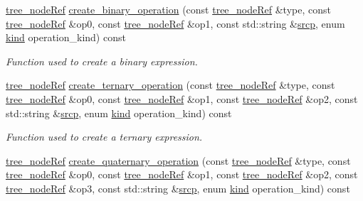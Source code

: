 \begin{DoxyCompactItemize}
\hyperlink{tree__node_8hpp_a6ee377554d1c4871ad66a337eaa67fd5}{tree\+\_\+node\+Ref} \hyperlink{classtree__manipulation_a69dbd230e26dc9f0677f16c57defe666}{create\+\_\+binary\+\_\+operation} (const \hyperlink{tree__node_8hpp_a6ee377554d1c4871ad66a337eaa67fd5}{tree\+\_\+node\+Ref} \&type, const \hyperlink{tree__node_8hpp_a6ee377554d1c4871ad66a337eaa67fd5}{tree\+\_\+node\+Ref} \&op0, const \hyperlink{tree__node_8hpp_a6ee377554d1c4871ad66a337eaa67fd5}{tree\+\_\+node\+Ref} \&op1, const std\+::string \&\hyperlink{structsrcp}{srcp}, enum \hyperlink{tree__common_8hpp_a9efbd7c7191fb190b76c2fd05d6e7b45}{kind} operation\+\_\+kind) const
\begin{DoxyCompactList}\small\item\em Function used to create a binary expression. \end{DoxyCompactList}\item 
\hyperlink{tree__node_8hpp_a6ee377554d1c4871ad66a337eaa67fd5}{tree\+\_\+node\+Ref} \hyperlink{classtree__manipulation_a58fb7eaf45317b4fc556b8b4fefd45fd}{create\+\_\+ternary\+\_\+operation} (const \hyperlink{tree__node_8hpp_a6ee377554d1c4871ad66a337eaa67fd5}{tree\+\_\+node\+Ref} \&type, const \hyperlink{tree__node_8hpp_a6ee377554d1c4871ad66a337eaa67fd5}{tree\+\_\+node\+Ref} \&op0, const \hyperlink{tree__node_8hpp_a6ee377554d1c4871ad66a337eaa67fd5}{tree\+\_\+node\+Ref} \&op1, const \hyperlink{tree__node_8hpp_a6ee377554d1c4871ad66a337eaa67fd5}{tree\+\_\+node\+Ref} \&op2, const std\+::string \&\hyperlink{structsrcp}{srcp}, enum \hyperlink{tree__common_8hpp_a9efbd7c7191fb190b76c2fd05d6e7b45}{kind} operation\+\_\+kind) const
\begin{DoxyCompactList}\small\item\em Function used to create a ternary expression. \end{DoxyCompactList}\item 
\hyperlink{tree__node_8hpp_a6ee377554d1c4871ad66a337eaa67fd5}{tree\+\_\+node\+Ref} \hyperlink{classtree__manipulation_aa9849e14cb81af9fc59f6e018cba6290}{create\+\_\+quaternary\+\_\+operation} (const \hyperlink{tree__node_8hpp_a6ee377554d1c4871ad66a337eaa67fd5}{tree\+\_\+node\+Ref} \&type, const \hyperlink{tree__node_8hpp_a6ee377554d1c4871ad66a337eaa67fd5}{tree\+\_\+node\+Ref} \&op0, const \hyperlink{tree__node_8hpp_a6ee377554d1c4871ad66a337eaa67fd5}{tree\+\_\+node\+Ref} \&op1, const \hyperlink{tree__node_8hpp_a6ee377554d1c4871ad66a337eaa67fd5}{tree\+\_\+node\+Ref} \&op2, const \hyperlink{tree__node_8hpp_a6ee377554d1c4871ad66a337eaa67fd5}{tree\+\_\+node\+Ref} \&op3, const std\+::string \&\hyperlink{structsrcp}{srcp}, enum \hyperlink{tree__common_8hpp_a9efbd7c7191fb190b76c2fd05d6e7b45}{kind} operation\+\_\+kind) const

\end{DoxyCompactItemize}

